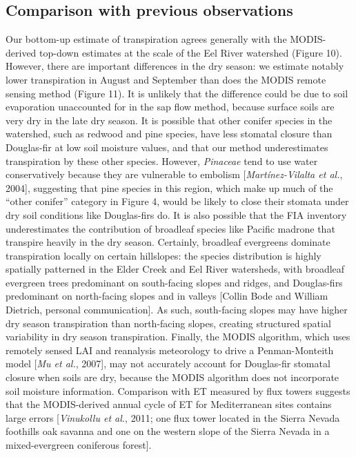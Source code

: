 \subsection{Comparison with previous observations}
Our bottom-up estimate of transpiration agrees generally with the MODIS-derived top-down estimates at the scale of the Eel River watershed (Figure 10).  However, there are important differences in the dry season: we estimate notably lower transpiration in August and September than does the MODIS remote sensing method (Figure 11).  It is unlikely that the difference could be due to soil evaporation unaccounted for in the sap flow method, because surface soils are very dry in the late dry season.  It is possible that other conifer species in the watershed, such as redwood and pine species, have less stomatal closure than Douglas-fir at low soil moisture values, and that our method underestimates transpiration by these other species.  However, \textit{Pinaceae} tend to use water conservatively because they are vulnerable to embolism [\textit{Mart\'inez-Vilalta et al.}, 2004], suggesting that pine species in this region, which make up much of the ``other conifer'' category in Figure 4, would be likely to close their stomata under dry soil conditions like Douglas-firs do.  It is also possible that the FIA inventory underestimates the contribution of broadleaf species like Pacific madrone that transpire heavily in the dry season.  Certainly, broadleaf evergreens dominate transpiration locally on certain hillslopes: the species distribution is highly spatially patterned in the Elder Creek and Eel River watersheds, with broadleaf evergreen trees predominant on south-facing slopes and ridges, and Douglas-firs predominant on north-facing slopes and in valleys [Collin Bode and William Dietrich, personal communication].  As such, south-facing slopes may have higher dry season transpiration than north-facing slopes, creating structured spatial variability in dry season transpiration.  Finally, the MODIS algorithm, which uses remotely sensed LAI and reanalysis meteorology to drive a Penman-Monteith model [\textit{Mu et al.}, 2007], may not accurately account for Douglas-fir stomatal closure when soils are dry, because the MODIS algorithm does not incorporate soil moisture information.  Comparison with ET measured by flux towers suggests that the MODIS-derived annual cycle of ET for Mediterranean sites contains large errors [\textit{Vinukollu et al.}, 2011; one flux tower located in the Sierra Nevada foothills oak savanna and one on the western slope of the Sierra Nevada in a mixed-evergreen coniferous forest].

